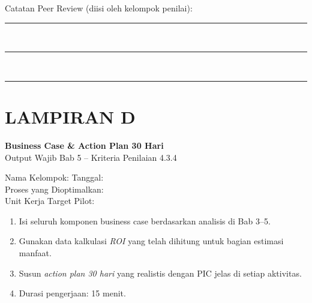 \documentclass[12pt,a4paper]{report}
\begin{document}
\vspace{0.3cm}

\noindent Catatan Peer Review (diisi oleh kelompok penilai):\\[0.2cm]
\noindent\rule{\textwidth}{0.3pt}\writespace[0.8cm]\\
\noindent\rule{\textwidth}{0.3pt}\writespace[0.8cm]\\
\noindent\rule{\textwidth}{0.3pt}


\newpage
\section*{\color{plnblue} LAMPIRAN D}
{\Large\bfseries Business Case \& Action Plan 30 Hari}\\[0.15cm]
{\normalsize\color{medgray}Output Wajib Bab 5 -- Kriteria Penilaian 4.3.4}

\vspace{0.4cm}

\noindent Nama Kelompok: \fillline \quad Tanggal: \fillline[3cm]\\[0.25cm]
Proses yang Dioptimalkan: \fillline[10cm]\\[0.25cm]
Unit Kerja Target Pilot: \fillline[10cm]

\begin{wsinstruksibox}
\begin{enumerate}
    \item Isi seluruh komponen business case berdasarkan analisis di Bab 3--5.
    \item Gunakan data kalkulasi \textit{ROI} yang telah dihitung untuk bagian estimasi manfaat.
    \item Susun \textit{action plan 30 hari} yang realistis dengan PIC jelas di setiap aktivitas.
    \item Durasi pengerjaan: 15 menit.
\end{enumerate}
\end{wsinstruksibox}

\vspace{0.3cm}
\end{document}
